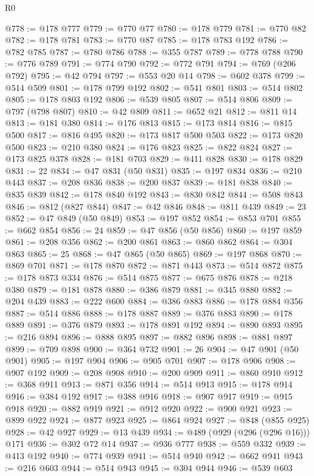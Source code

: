 \begin{lexlean}{R0}
\begin{coremodule}
@778 := @178 @777
@779 := @770 @77
@780 := @178 @779
@781 := @770 @82
@782 := @178 @781
@783 := @770 @87
@785 := @178 @783 @192
@786 := @782 @785
@787 := @780 @786
@788 := @355 @787
@789 := @778 @788
@790 := @776 @789
@791 := @774 @790
@792 := @772 @791
@794 := @769 (@206 @792)
@795 := @42 @794
@797 := @553 @20 @14
@798 := @602 @378
@799 := @514 @509
@801 := @178 @799 @192
@802 := @541 @801
@803 := @514 @802
@805 := @178 @803 @192
@806 := @539 @805
@807 := @514 @806
@809 := @797 (@798 @807)
@810 := @42 @809
@811 := @652 @21
@812 := @811 @14
@813 := @181 @380
@814 := @176 @813
@815 := @173 @814
@816 := @815 @500
@817 := @816 @495
@820 := @173 @817 @500 @503
@822 := @173 @820 @500
@823 := @210 @380
@824 := @176 @823
@825 := @822 @824
@827 := @173 @825 @378
@828 := @181 @703
@829 := @411 @828
@830 := @178 @829
@831 := 22
@834 := @47 @831 (@50 @831)
@835 := @197 @834
@836 := @210 @443
@837 := @208 @836
@838 := @200 @837
@839 := @181 @838
@840 := @835 @839
@842 := @178 @840 @192
@843 := @830 @842
@844 := @508 @843
@846 := @812 (@827 @844)
@847 := @42 @846
@848 := @811 @439
@849 := 23
@852 := @47 @849 (@50 @849)
@853 := @197 @852
@854 := @853 @701
@855 := @662 @854
@856 := 24
@859 := @47 @856 (@50 @856)
@860 := @197 @859
@861 := @208 @356
@862 := @200 @861
@863 := @860 @862
@864 := @304 @863
@865 := 25
@868 := @47 @865 (@50 @865)
@869 := @197 @868
@870 := @869 @701
@871 := @178 @870
@872 := @871 @443
@873 := @514 @872
@875 := @178 @873 @334
@876 := @514 @875
@877 := @675 @876
@878 := @218 @380
@879 := @181 @878
@880 := @386 @879
@881 := @345 @880
@882 := @204 @439
@883 := @222 @600
@884 := @386 @883
@886 := @178 @884 @356
@887 := @514 @886
@888 := @178 @887
@889 := @376 @883
@890 := @178 @889
@891 := @376 @879
@893 := @178 @891 @192
@894 := @890 @893
@895 := @216 @894
@896 := @888 @895
@897 := @882 @896
@898 := @881 @897
@899 := @709 @898
@900 := @364 @732
@901 := 26
@904 := @47 @901 (@50 @901)
@905 := @197 @904
@906 := @905 @701
@907 := @178 @906
@908 := @907 @192
@909 := @208 @908
@910 := @200 @909
@911 := @860 @910
@912 := @368 @911
@913 := @871 @356
@914 := @514 @913
@915 := @178 @914
@916 := @384 @192
@917 := @388 @916
@918 := @907 @917
@919 := @915 @918
@920 := @882 @919
@921 := @912 @920
@922 := @900 @921
@923 := @899 @922
@924 := @877 @923
@925 := @864 @924
@927 := @848 (@855 @925)
@928 := @42 @927
@929 := @13 @439
@934 := @489 (@929 (@296 (@296 @16))) @171
@936 := @302 @72 @14
@937 := @936 @777
@938 := @559 @332
@939 := @413 @192
@940 := @774 @939
@941 := @514 @940
@942 := @662 @941
@943 := @216 @603
@944 := @514 @943
@945 := @304 @944
@946 := @539 @603

\end{coremodule}
\end{lexlean}
